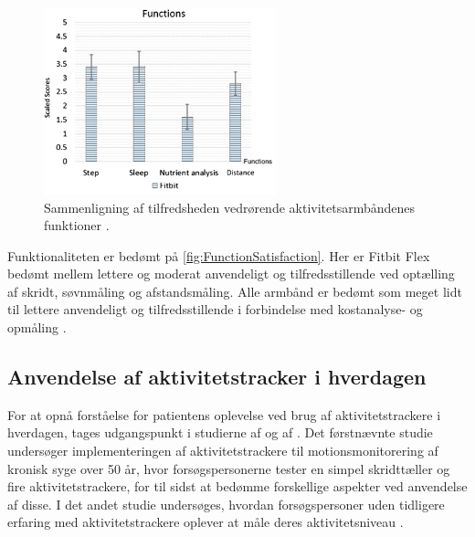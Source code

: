 \begin{figure}[H]
	\centering
	\includegraphics[width=0.6\textwidth]{figures/FunctionSatisfaction2}
	\caption{Sammenligning af tilfredsheden vedrørende aktivitetsarmbåndenes funktioner \citep{kaewkannate2016}.}
	\label{fig:FunctionSatisfaction}
\end{figure}

\noindent
Funktionaliteten er bedømt på \autoref{fig:FunctionSatisfaction}. Her er Fitbit Flex bedømt mellem lettere og moderat anvendeligt og tilfredsstillende ved optælling af skridt, søvnmåling og afstandsmåling. Alle armbånd er bedømt som meget lidt til lettere anvendeligt og tilfredsstillende i forbindelse med kostanalyse- og opmåling \citep{kaewkannate2016}.

\subsection{Anvendelse af aktivitetstracker i hverdagen} \label{sec:anvendelse}

For at opnå forståelse for patientens oplevelse ved brug af aktivitetstrackere i hverdagen, tages udgangspunkt i studierne  af \citeauthor{mercer2016} og  af \citeauthor{rapp2016}. Det førstnævnte studie undersøger implementeringen af aktivitetstrackere til motionsmonitorering af kronisk syge over 50 år, hvor forsøgspersonerne tester en simpel skridttæller og fire aktivitetstrackere, for til sidst at bedømme forskellige aspekter ved anvendelse af disse. I det andet studie undersøges, hvordan forsøgspersoner uden tidligere erfaring med aktivitetstrackere oplever at måle deres aktivitetsniveau \citep{mercer2016, rapp2016}.

